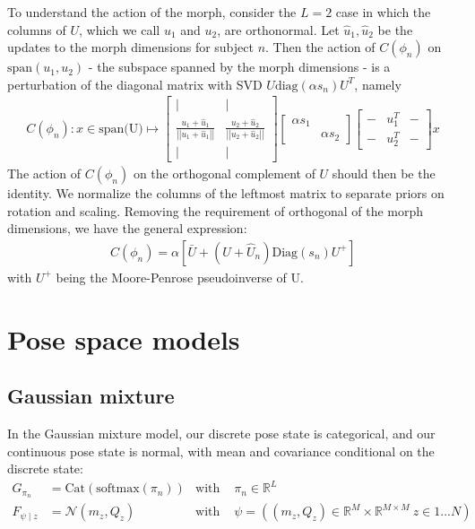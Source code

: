 \documentclass{article}         %
\newcommand{\RR}{\mathbb{R}}
\newcommand{\NN}{\mathcal{N}}
\newcommand{\mat}[1]{\begin{matrix} #1 \end{matrix}}
\newcommand{\norm}[1]{\left|\left| #1 \right|\right|}
\newcommand{\pn}[1]{\left( #1 \right)}
\newcommand{\bc}[1]{\left[ #1 \right]}
\begin{document}
To understand the action of the morph, consider the $L=2$ case in which the columns of $U$, which we call $u_1$ and $u_2$, are orthonormal. Let $\hat{u}_1, \hat{u}_2$ be the updates to the morph dimensions for subject $n$. Then the action of $C(\phi_n)$ on $\text{span}(u_1, u_2)$ - the subspace spanned by the morph dimensions - is a perturbation of the diagonal matrix with SVD $U\text{diag}(\alpha s_n) U^T$, namely
\begin{align}
    C(\phi_n) : x\in \text{span(U)} \mapsto \bc{\mat{ | & | \\ \frac{u_1 + \hat{u}_1}{\norm{u_1 + \hat{u}_1}} & \frac{u_2 + \hat{u}_2}{\norm{u_2 + \hat{u}_2}} \\ | & |  }}
    \bc{\mat{ \alpha s_1 & \\ & \alpha s_2 }}
    \bc{\mat{ - & u_1^T & - \\ - & u_2^T & -}}x
\end{align}
The action of $C(\phi_n)$ on the orthogonal complement of $U$ should then be the identity. We normalize the columns of the leftmost matrix to separate priors on rotation and scaling. Removing the requirement of orthogonal of the morph dimensions, we have the general expression:
\begin{align}
    C(\phi_n) = \alpha \bc{ \bar{U} + \pn{U + \hat{U}_n}\text{Diag}\pn{s_n}U^+ }
\end{align}
with $U^+$ being the Moore-Penrose pseudoinverse of U.






\section{Pose space models}


\subsection{Gaussian mixture}

In the Gaussian mixture model, our discrete pose state is categorical, and our continuous pose state is normal, with mean and covariance conditional on the discrete state:
\begin{align*}
    G_{\pi_n} &= \text{Cat}({\text{softmax}(\pi_n)}) & \text{with\ }&\pi_n \in \RR^L \\
    F_{\psi\mid z} &= \NN(m_z, Q_z) & \text{with\ }&\psi = ((m_z, Q_z) \in \RR^{M} \times \RR^{M\times M}\ z\in 1 ... N)
\end{align*}
\end{document}
